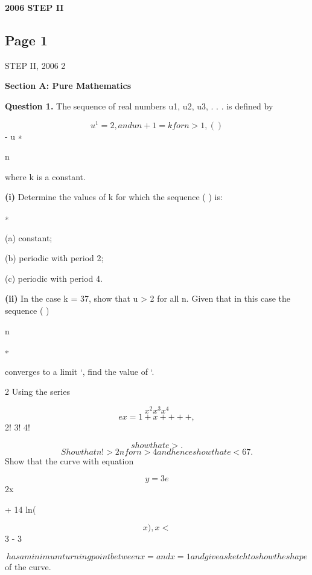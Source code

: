 \documentclass[12pt]{article}
\begin{document}
\begin{center}
{\Large \textbf{2006 STEP II}}
\end{center}

\subsection*{Page 1}
\begin{flushleft}
STEP II, 2006 2\par
\bigskip\textbf{Section A: Pure Mathematics}\par
\bigskip\textbf{Question 1.} The sequence of real numbers u1, u2, u3, . . . is defined by\par
\[u^1 = 2 , and u n+1 = k for n > 1, ( )\]
- u ∗\par
n\par
where k is a constant.\par
\textbf{(i)} Determine the values of k for which the sequence ( ) is:\par
∗\par
(a) constant;\par
(b) periodic with period 2;\par
(c) periodic with period 4.\par
\textbf{(ii)} In the case k = 37, show that u > 2 for all n. Given that in this case the sequence ( )\par
n\par
∗\par
converges to a limit `, find the value of `.\par
2 Using the series\par
\[x^2 x^3 x^4\]
\[ex = 1 + x + + + + ,\]
2! 3! 4! \cdots\par
\[show that e > .\]
\[Show that n! > 2n for n > 4 and hence show that e < 67 .\]
Show that the curve with equation\par
\[y = 3e\]
2x\par
+ 14 ln(\par
\[x) , x <\]
3 - 3\par
\[has a minimum turning point between x = and x = 1 and give a sketch to show the shape\]
of the curve.\par
\end{flushleft}
\end{document}
